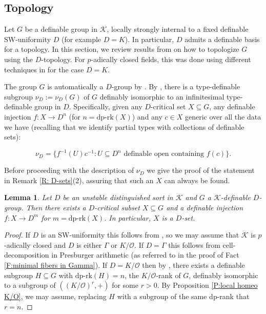 \documentclass[11pt]{amsart}
\newtheorem{lemma}[theorem]{Lemma}
\theoremstyle{definition}
\newcommand{\CK}{{\mathcal K}}
\newcommand{\CO}{{\mathcal O}}
\newcommand{\0}{\emptyset}
\def\dpr{\mathrm{dp\text{-}rk}}
\def\sub{\subseteq}
\begin{document}
\subsection{Topology}\label{section: topology} 
  Let $G$ be a definable group in $\CK$, locally strongly internal to a fixed definable SW-uniformity $D$ (for example  $D=K$). In particular, $D$ admits a definable basis for a topology. 
In this section, we review results from \cite{HaHaPeGps} on how to topologize $G$ using the $D$-topology. For $p$-adically closed fields, this was done using different techniques in \cite{JohnTopQp} for the case $D=K$.

 The group $G$ is automatically a $D$-group by \cite[Fact 4.25(1)]{HaHaPeGps}. By \cite[Proposition 5.8]{HaHaPeGps}, there is a type-definable subgroup $\nu_D:=\nu_D(G)$ of $G$ definably isomorphic to an infinitesimal type-definable group in $D$.  Specifically, given any $D$-critical set $X\subseteq G$, any definable injection $f:X\to D^n$ (for $n=\dpr(X)$)  and  any $c\in X$ generic over all the data we have  (recalling that we identify partial types with collections of definable sets):

\begin{equation}
    \label{eq: nuK}
\nu_D=\{f^{-1}(U)c^{-1}: U\subseteq D^n \text{ definable open containing $f(c)$}\}.\end{equation}


Before proceeding with the description of $\nu_D$ we give the proof of the statement in Remark \ref{R: D-sets}(2),  assuring that such an $X$ can always be found.

 
\begin{lemma}\label{L: Dsets}
   Let $D$ be an unstable distinguished sort in $\CK$ and  $G$ a $\CK$-definable $D$-group. Then  there exists a $D$-critical subset $X\sub G$ and a definable injection $f: X\to D^m$ for $m=\dpr(X)$. In particular, $X$ is a $D$-set.
\end{lemma}
\begin{proof}
    If $D$ is an SW-uniformity this follows from \cite[Proposition 4.6]{SimWal}, so we may assume that $\CK$ is $p$-adically closed and $D$ is either $\Gamma$ or $K/\CO$. If $D=\Gamma$ this follows from cell-decomposition in Presburger arithmetic (as referred to in the proof of Fact \ref{F:minimal fibers in Gamma}). If $D=K/\CO$ then by \cite[Theorem 7.11(3)]{HaHaPeGps}, there exists a definable subgroup $H\subseteq G$ with $\dpr(H)=n$, the $K/\CO$-rank of $G$, definably isomorphic to a subgroup of $((K/\CO)^r,+)$ for some $r>0$. By Proposition \ref{P:local homeo K/O}, we may assume, replacing $H$ with a subgroup of the same dp-rank that $r=n$.
\end{proof}
 
\end{document}
